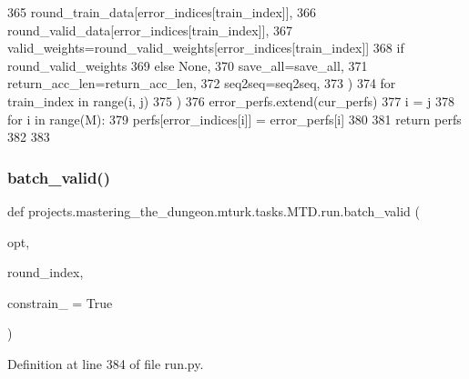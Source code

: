 \begin{DoxyCode}
365                     round\_train\_data[error\_indices[train\_index]],
366                     round\_valid\_data[error\_indices[train\_index]],
367                     valid\_weights=round\_valid\_weights[error\_indices[train\_index]]
368                     \textcolor{keywordflow}{if} round\_valid\_weights
369                     \textcolor{keywordflow}{else} \textcolor{keywordtype}{None},
370                     save\_all=save\_all,
371                     return\_acc\_len=return\_acc\_len,
372                     seq2seq=seq2seq,
373                 )
374                 \textcolor{keywordflow}{for} train\_index \textcolor{keywordflow}{in} range(i, j)
375             )
376             error\_perfs.extend(cur\_perfs)
377             i = j
378         \textcolor{keywordflow}{for} i \textcolor{keywordflow}{in} range(M):
379             perfs[error\_indices[i]] = error\_perfs[i]
380 
381     \textcolor{keywordflow}{return} perfs
382 
383 
\end{DoxyCode}
\mbox{\label{namespaceprojects_1_1mastering__the__dungeon_1_1mturk_1_1tasks_1_1MTD_1_1run_a179bf2b92b1beed2a6edb67b152cd659}} 
\subsubsection{\texorpdfstring{batch\+\_\+valid()}{batch\_valid()}}
{\footnotesize\ttfamily def projects.\+mastering\+\_\+the\+\_\+dungeon.\+mturk.\+tasks.\+M\+T\+D.\+run.\+batch\+\_\+valid (\begin{DoxyParamCaption}\item[{}]{opt,  }\item[{}]{round\+\_\+index,  }\item[{}]{constrain\+\_\+ = {\ttfamily True} }\end{DoxyParamCaption})}



Definition at line 384 of file run.\+py.


